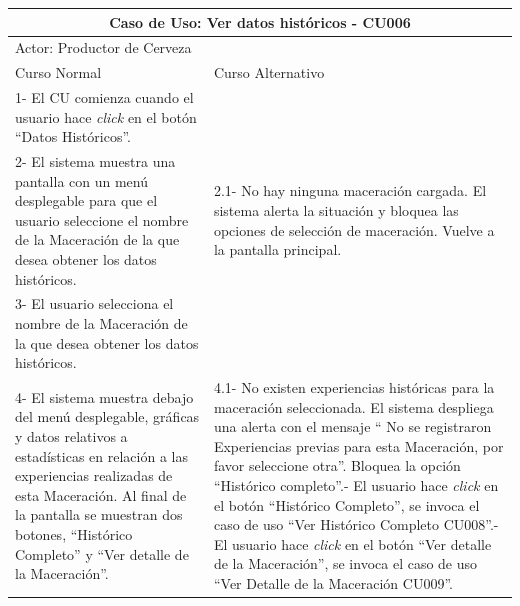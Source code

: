     
    \begin{minipage}{0.95\textwidth}
    \begin{center}
    \begin{tabularx}{\textwidth}{ | X | X |}
        \hline
        \multicolumn{2}{|c|}{\textbf{Caso de Uso: Ver datos históricos - CU006}} \\
        \hline
        \multicolumn{2}{|l|}{Actor: Productor de Cerveza} \\
        \hline
        Curso Normal & Curso Alternativo \\
        \hline
        1- El CU comienza cuando el usuario hace \textit{click} en el botón “Datos Históricos”. & \\
        \hline
        2- El sistema muestra una pantalla con un menú desplegable para que el usuario seleccione el nombre de la Maceración de la que desea obtener los datos históricos. & 2.1- No hay ninguna maceración cargada. El sistema alerta la situación y bloquea las opciones de selección de maceración. Vuelve a la pantalla principal.\\
        \hline
        3- El usuario selecciona el nombre de la Maceración de la que desea obtener los datos históricos. &
        \\
        \hline
        4- El sistema muestra debajo del menú desplegable, gráficas y datos relativos a estadísticas en relación a las experiencias realizadas de esta Maceración. Al final de la pantalla se muestran dos botones, “Histórico Completo” y “Ver detalle de la Maceración”. & 4.1- No existen experiencias históricas para la maceración seleccionada. El sistema despliega una alerta con el mensaje “ No se registraron Experiencias previas para esta Maceración, por favor seleccione otra”. Bloquea la opción “Histórico completo”.\newline
        4.2- El usuario hace \textit{click} en el botón “Histórico Completo”, se invoca el caso de uso “Ver Histórico Completo CU008”.\newline
        4.3-El usuario hace \textit{click} en el botón “Ver detalle de la Maceración”, se invoca el caso de uso “Ver Detalle de la Maceración CU009”.
        \\
        \hline
    \end{tabularx}
    \label{CU006}
    \end{center}
    \end{minipage}
    
